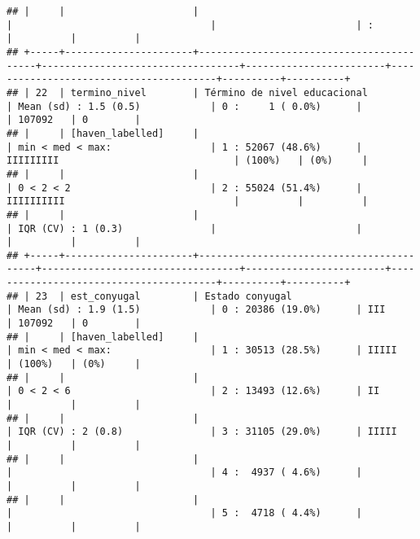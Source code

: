 \documentclass[]{article}
\begin{document}
\begin{verbatim}
## |     |                      |                                          |                                  |                        | :                                      |          |          |
## +-----+----------------------+------------------------------------------+----------------------------------+------------------------+----------------------------------------+----------+----------+
## | 22  | termino_nivel        | Término de nivel educacional             | Mean (sd) : 1.5 (0.5)            | 0 :     1 ( 0.0%)      |                                        | 107092   | 0        |
## |     | [haven_labelled]     |                                          | min < med < max:                 | 1 : 52067 (48.6%)      | IIIIIIIII                              | (100%)   | (0%)     |
## |     |                      |                                          | 0 < 2 < 2                        | 2 : 55024 (51.4%)      | IIIIIIIIII                             |          |          |
## |     |                      |                                          | IQR (CV) : 1 (0.3)               |                        |                                        |          |          |
## +-----+----------------------+------------------------------------------+----------------------------------+------------------------+----------------------------------------+----------+----------+
## | 23  | est_conyugal         | Estado conyugal                          | Mean (sd) : 1.9 (1.5)            | 0 : 20386 (19.0%)      | III                                    | 107092   | 0        |
## |     | [haven_labelled]     |                                          | min < med < max:                 | 1 : 30513 (28.5%)      | IIIII                                  | (100%)   | (0%)     |
## |     |                      |                                          | 0 < 2 < 6                        | 2 : 13493 (12.6%)      | II                                     |          |          |
## |     |                      |                                          | IQR (CV) : 2 (0.8)               | 3 : 31105 (29.0%)      | IIIII                                  |          |          |
## |     |                      |                                          |                                  | 4 :  4937 ( 4.6%)      |                                        |          |          |
## |     |                      |                                          |                                  | 5 :  4718 ( 4.4%)      |                                        |          |          |

\end{verbatim}
\end{document}
